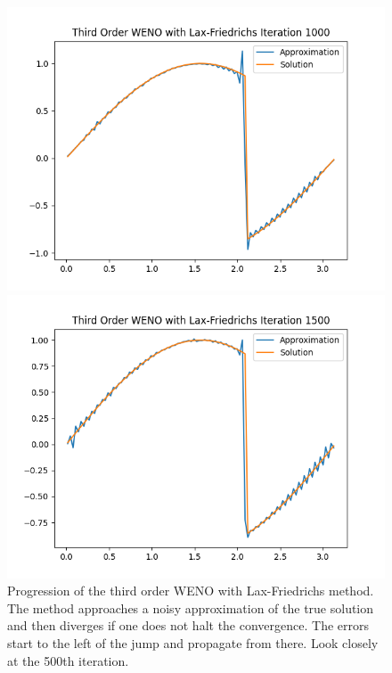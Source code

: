 \documentclass{article}
\begin{document}
\begin{figure}[t!]
\begin{minipage}{.48\textwidth}
    \end{minipage}
\par\bigskip
    \begin{minipage}{.48\textwidth}
        \centering
        \includegraphics[width=0.9\linewidth]{imgs/output_weno3_lf/plot_1000.png}
    \end{minipage}%
    \begin{minipage}{.48\textwidth}
        \centering
        \includegraphics[width=0.9\linewidth]{imgs/output_weno3_lf/plot_1500.png}
    \end{minipage}
\caption{Progression of the third order WENO with Lax-Friedrichs method. The method approaches a noisy approximation of the true solution and then diverges if one does not halt the convergence. The errors start to the left of the jump and propagate from there. Look closely at the 500th iteration.}
\end{figure}
\newpage
\end{document}
